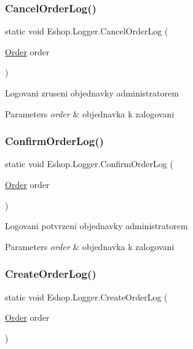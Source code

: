 \subsubsection{\texorpdfstring{CancelOrderLog()}{CancelOrderLog()}}
{\footnotesize\ttfamily static void Eshop.\+Logger.\+Cancel\+Order\+Log (\begin{DoxyParamCaption}\item[{\mbox{\hyperlink{class_eshop_1_1_order}{Order}}}]{order }\end{DoxyParamCaption})\hspace{0.3cm}{\ttfamily [static]}}



Logovani zruseni objednavky administratorem 


\begin{DoxyParams}{Parameters}
{\em order} & objednavka k zalogovani\\
\hline
\end{DoxyParams}
\mbox{\label{class_eshop_1_1_logger_a9af64dcef86bc9f5c7ebe8a21b483c5d}} 
\subsubsection{\texorpdfstring{ConfirmOrderLog()}{ConfirmOrderLog()}}
{\footnotesize\ttfamily static void Eshop.\+Logger.\+Confirm\+Order\+Log (\begin{DoxyParamCaption}\item[{\mbox{\hyperlink{class_eshop_1_1_order}{Order}}}]{order }\end{DoxyParamCaption})\hspace{0.3cm}{\ttfamily [static]}}



Logovani potvrzeni objednavky administratorem 


\begin{DoxyParams}{Parameters}
{\em order} & objednavka k zalogovani\\
\hline
\end{DoxyParams}
\mbox{\label{class_eshop_1_1_logger_a49f136196c9a633c3e09ab8a04e0474e}} 
\subsubsection{\texorpdfstring{CreateOrderLog()}{CreateOrderLog()}}
{\footnotesize\ttfamily static void Eshop.\+Logger.\+Create\+Order\+Log (\begin{DoxyParamCaption}\item[{\mbox{\hyperlink{class_eshop_1_1_order}{Order}}}]{order }\end{DoxyParamCaption})\hspace{0.3cm}{\ttfamily [static]}}



